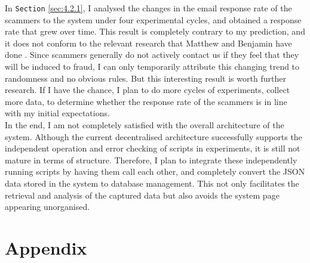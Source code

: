 \documentclass[ oneside,%
                    author={Cassie Qing Tang},
                    degree={BSc},
                     title={An Automated Response System for Disrupting Online Pet Scamming \\ },
                    subtitle={ }]{dissertation}
\begin{document}
In \texttt{Section} \ref{sec:4.2.1}, I analysed the changes in the email response rate of the scammers to the system under four experimental cycles, and obtained a response rate that grew over time. This result is completely contrary to my prediction, and it does not conform to the relevant research that Matthew and Benjamin have done \cite{price_resource_2020}. Since scammers generally do not actively contact us if they feel that they will be induced to fraud, I can only temporarily attribute this changing trend to randomness and no obvious rules. But this interesting result is worth further research. If I have the chance, I plan to do more cycles of experiments, collect more data, to determine whether the response rate of the scammers is in line with my initial expectations.
\\

In the end, I am not completely satisfied with the overall architecture of the system. Although the current decentralised architecture successfully supports the independent operation and error checking of scripts in experiments, it is still not mature in terms of structure. Therefore, I plan to integrate these independently running scripts by having them call each other, and completely convert the JSON data stored in the system to database management. This not only facilitates the retrieval and analysis of the captured data but also avoids the system page appearing unorganised.

% 


\appendix

\chapter{Appendix}
\label{}
\end{document}
